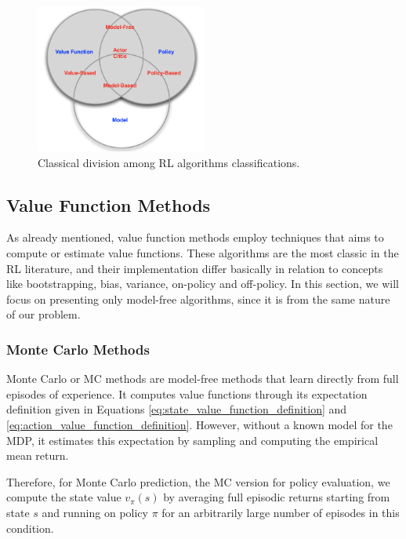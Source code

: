 

\begin{figure}[H]
    \centering
    \includegraphics[width=0.5\textwidth]{Chapter2/categorizing_RL.png} 
    \caption{Classical division among RL algorithms classifications.}
    \label{fig:categorizing_RL}
\end{figure}

\subsection{Value Function Methods}

As already mentioned, value function methods employ techniques that aims to compute or estimate value functions. These algorithms are the most classic in the RL literature, and their implementation differ basically in relation to concepts like bootstrapping, bias, variance, on-policy and off-policy. In this section, we will focus on presenting only model-free algorithms, since it is from the same nature of our problem.

\subsubsection{Monte Carlo Methods}

Monte Carlo or MC methods \cite{Sutton1998} are model-free methods that learn directly from full episodes of experience. It computes value functions through its expectation definition given in Equations \eqref{eq:state_value_function_definition} and \eqref{eq:action_value_function_definition}. However, without a known model for the MDP, it estimates this expectation by sampling and computing the empirical mean return.

Therefore, for Monte Carlo prediction, the MC version for policy evaluation, we compute the state value $v_{\pi}(s)$ by averaging full episodic returns starting from state $s$ and running on policy $\pi$ for an arbitrarily large number of episodes in this condition.

